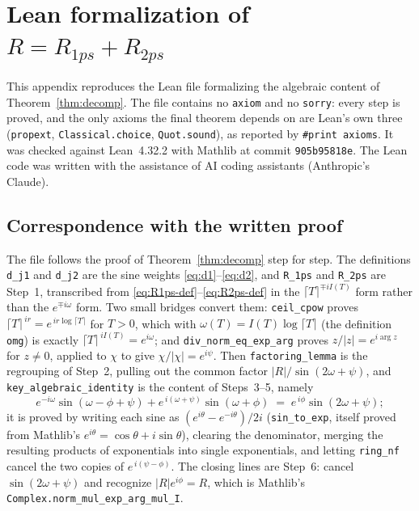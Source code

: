 \documentclass[11pt]{article}
\theoremstyle{definition}
\begin{document}
\appendix

\section{Lean formalization of \texorpdfstring{$R=R_{1ps}+R_{2ps}$}{R = R1ps + R2ps}}
\label{app:lean-decomp}

This appendix reproduces the Lean file formalizing the algebraic content of
Theorem~\ref{thm:decomp}. The file contains no \texttt{axiom} and no
\texttt{sorry}: every step is proved, and the only axioms the final theorem
depends on are Lean's own three (\texttt{propext},
\texttt{Classical.choice}, \texttt{Quot.sound}), as reported by
\texttt{\#print axioms}. It was checked against Lean~4.32.2 with Mathlib at
commit \texttt{905b95818e}. The Lean code was written with the assistance of AI
coding assistants (Anthropic's Claude).

\subsection{Correspondence with the written proof}

The file follows the proof of Theorem~\ref{thm:decomp} step for step. The
definitions \texttt{d\_j1} and \texttt{d\_j2} are the sine weights
\eqref{eq:d1}--\eqref{eq:d2}, and \texttt{R\_1ps} and \texttt{R\_2ps} are Step~1,
transcribed from \eqref{eq:R1ps-def}--\eqref{eq:R2ps-def} in the
$\lceil T\rceil^{\mp iI(T)}$ form rather than the $e^{\mp i\omega}$ form.
Two small bridges convert them: \texttt{ceil\_cpow} proves
$\lceil T\rceil^{\,ir}=e^{\,ir\log\lceil T\rceil}$ for $T>0$, which with
$\omega(T)=I(T)\log\lceil T\rceil$ (the definition \texttt{omg}) is exactly
$\lceil T\rceil^{\,iI(T)}=e^{i\omega}$; and
\texttt{div\_norm\_eq\_exp\_arg} proves $z/|z|=e^{i\arg z}$ for $z\neq0$, applied
to $\chi$ to give $\chi/|\chi|=e^{i\psi}$. Then
\texttt{factoring\_lemma} is the regrouping of Step~2, pulling out the common
factor $|R|/\sin(2\omega+\psi)$, and
\texttt{key\_algebraic\_identity} is the content of Steps~3--5, namely
\begin{equation}\label{eq:lean-key}
e^{-i\omega}\sin(\omega-\phi+\psi)+e^{\,i(\omega+\psi)}\sin(\omega+\phi)
\;=\;
e^{\,i\phi}\sin(2\omega+\psi);
\end{equation}
it is proved by writing each sine as
$(e^{i\theta}-e^{-i\theta})/2i$ (\texttt{sin\_to\_exp}, itself proved from
Mathlib's $e^{i\theta}=\cos\theta+i\sin\theta$), clearing the denominator,
merging the resulting products of exponentials into single exponentials, and
letting \texttt{ring\_nf} cancel the two copies of $e^{\,i(\psi-\phi)}$. The
closing lines are Step~6: cancel $\sin(2\omega+\psi)$ and recognize
$|R|e^{i\phi}=R$, which is Mathlib's
\texttt{Complex.norm\_mul\_exp\_arg\_mul\_I}.
\end{document}
